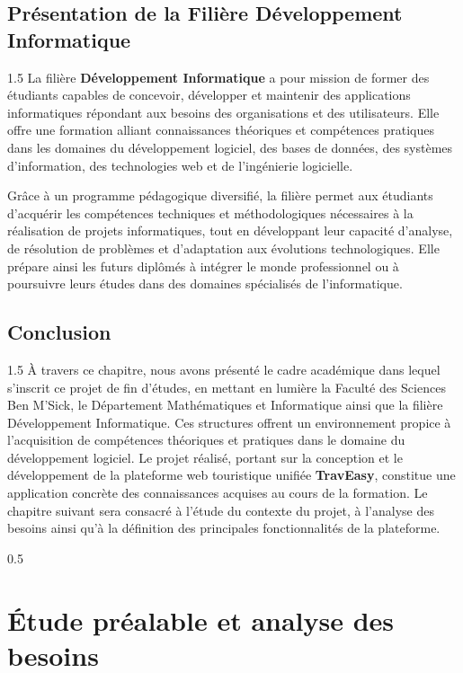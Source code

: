 \documentclass[a4paper,12pt]{report}
\begin{document}
\section{Présentation de la Filière Développement Informatique}
\vspace{0.5cm}
\begin{spacing}{1.5}
\justifying
La filière \textbf{Développement Informatique} a pour mission de former des étudiants capables de concevoir, développer et maintenir des applications informatiques répondant aux besoins des organisations et des utilisateurs. Elle offre une formation alliant connaissances théoriques et compétences pratiques dans les domaines du développement logiciel, des bases de données, des systèmes d'information, des technologies web et de l'ingénierie logicielle.

Grâce à un programme pédagogique diversifié, la filière permet aux étudiants d'acquérir les compétences techniques et méthodologiques nécessaires à la réalisation de projets informatiques, tout en développant leur capacité d'analyse, de résolution de problèmes et d'adaptation aux évolutions technologiques. Elle prépare ainsi les futurs diplômés à intégrer le monde professionnel ou à poursuivre leurs études dans des domaines spécialisés de l'informatique.

\end{spacing}

\section{Conclusion}
\vspace{0.5cm}
\begin{spacing}{1.5}
\justifying
À travers ce chapitre, nous avons présenté le cadre académique dans lequel s'inscrit ce projet de fin d'études, en mettant en lumière la Faculté des Sciences Ben M'Sick, le Département Mathématiques et Informatique ainsi que la filière Développement Informatique. Ces structures offrent un environnement propice à l'acquisition de compétences théoriques et pratiques dans le domaine du développement logiciel. Le projet réalisé, portant sur la conception et le développement de la plateforme web touristique unifiée \textbf{TravEasy}, constitue une application concrète des connaissances acquises au cours de la formation. Le chapitre suivant sera consacré à l'étude du contexte du projet, à l'analyse des besoins ainsi qu'à la définition des principales fonctionnalités de la plateforme.

\end{spacing}
\newpage
\begin{spacing}{0.5}
\chapter{ Étude préalable et analyse des besoins}
\end{spacing}
\end{document}
